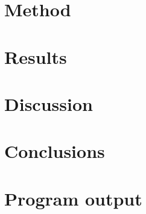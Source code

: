 \documentclass[a4paper,11pt]{kth-mag}
\begin{document}
\chapter{Method}\label{chap:method}
    
\chapter{Results}\label{chap:results}
    
\chapter{Discussion}\label{chap:discussion}
    
\chapter{Conclusions}\label{chap:conclusions}
    
\nocite{*}
\printbibliography{}

\appendix
\chapter{Program output}\label{appendix:output}

\end{document}
